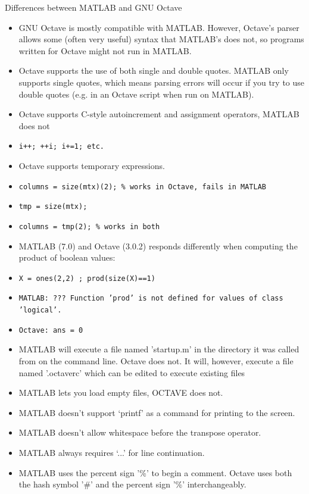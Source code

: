 \documentclass[t,compress,xcolor=svgnames]{beamer}
\begin{document}
\begin{frame}[allowframebreaks]{\small Differences between MATLAB and GNU Octave}
  \begin{itemize}
    \item GNU Octave is mostly compatible with MATLAB. However, Octave's parser allows some (often very useful) syntax that MATLAB's does not, so programs written for Octave might not run in MATLAB.
    \item Octave supports the use of both single and double quotes. MATLAB only supports single quotes, which means parsing errors will occur if you try to use double quotes (e.g. in an Octave script when run on MATLAB).
    \item Octave supports C-style autoincrement and assignment operators, MATLAB does not
    \item[] \texttt{i++; ++i; i+=1; etc.}
    \item Octave supports temporary expressions.
    \item[] \texttt{columns = size(mtx)(2);   \%  works in Octave, fails in MATLAB}
    \item[] \texttt{tmp = size(mtx);}
    \item[] \texttt{columns = tmp(2);         \%  works in both}
    \item MATLAB (7.0) and Octave (3.0.2) responds differently when computing the product of boolean values:
    \item[] \texttt{X = ones(2,2) ; prod(size(X)==1)}
    \item[] \texttt{MATLAB: ??? Function 'prod' is not defined for values of class 'logical'.}
    \item[] \texttt{Octave: ans = 0}
    \item MATLAB will execute a file named 'startup.m' in the directory it was called from on the command line. Octave does not. It will, however, execute a file named '.octaverc' which can be edited to execute existing files
    \item MATLAB lets you load empty files, OCTAVE does not.
    \item MATLAB doesn't support `printf' as a command for printing to the screen.
    \item MATLAB doesn't allow whitespace before the transpose operator.
    \item MATLAB always requires `...' for line continuation.
    \item MATLAB uses the percent sign '\%' to begin a comment. Octave uses both the hash symbol '\#' and the percent sign '\%' interchangeably.

\end{itemize}
\end{frame}
\end{document}
